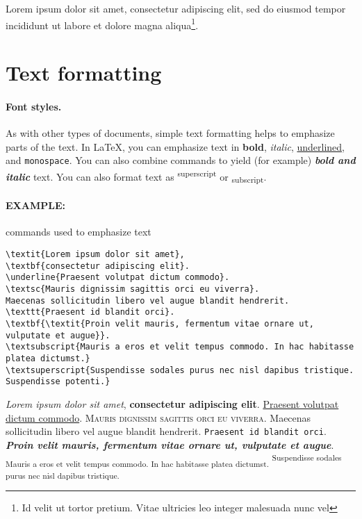 \documentclass[11pt]{article}
\begin{document}
Lorem ipsum dolor sit amet, consectetur adipiscing elit, sed do eiusmod tempor incididunt ut labore et dolore magna aliqua\footnote{Id velit ut tortor pretium. Vitae ultricies leo integer malesuada nunc vel}.




\section*{Text formatting}

\paragraph{Font styles.} As with other types of documents, simple text formatting helps to emphasize parts of the text. In {\LaTeX}, you can emphasize text in \textbf{bold}, \textit{italic}, \underline{underlined}, and \texttt{monospace}. You can also combine commands to yield (for example) \textbf{\textit{bold and italic}} text. You can also format text as \textsuperscript{superscript} or \textsubscript{subscript}.

\paragraph{EXAMPLE:} commands used to emphasize text

\begin{lstlisting}
\textit{Lorem ipsum dolor sit amet},
\textbf{consectetur adipiscing elit}.
\underline{Praesent volutpat dictum commodo}.
\textsc{Mauris dignissim sagittis orci eu viverra}.
Maecenas sollicitudin libero vel augue blandit hendrerit.
\texttt{Praesent id blandit orci}.
\textbf{\textit{Proin velit mauris, fermentum vitae ornare ut, vulputate et augue}}.
\textsubscript{Mauris a eros et velit tempus commodo. In hac habitasse platea dictumst.}
\textsuperscript{Suspendisse sodales purus nec nisl dapibus tristique. Suspendisse potenti.}
\end{lstlisting}
\textit{Lorem ipsum dolor sit amet}, %
\textbf{consectetur adipiscing elit}. %
\underline{Praesent volutpat dictum commodo}. %
\textsc{Mauris dignissim sagittis orci eu viverra}. %
Maecenas sollicitudin libero vel augue blandit hendrerit. \texttt{Praesent id blandit orci}. %
\textbf{\textit{Proin velit mauris, fermentum vitae ornare ut, vulputate et augue}}.
\textsubscript{Mauris a eros et velit tempus commodo. In hac habitasse platea dictumst.}
\textsuperscript{Suspendisse sodales purus nec nisl dapibus tristique.}
\end{document}
